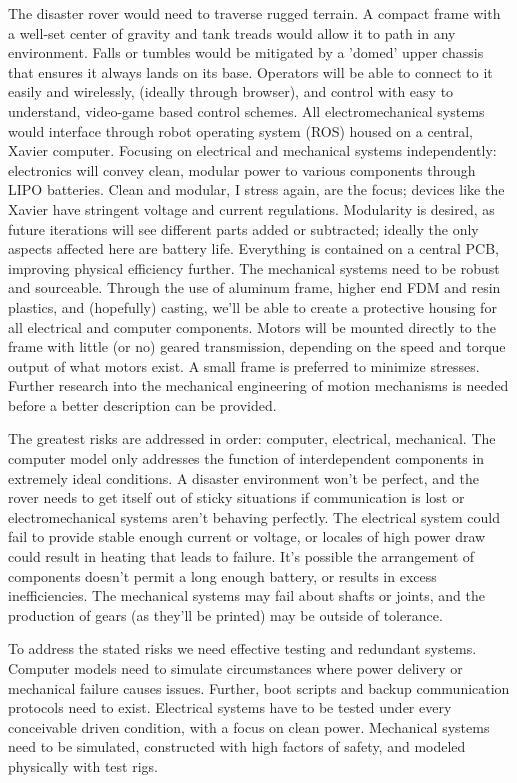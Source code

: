 \documentclass[a4paper, 10pt]{article}
\begin{document}
	The disaster rover would need to traverse rugged terrain. A compact frame with a well-set center of gravity and tank treads would allow it to path in any environment. Falls or tumbles would be mitigated by a 'domed' upper chassis that ensures it always lands on its base. Operators will be able to connect to it easily and wirelessly, (ideally through browser), and control with easy to understand, video-game based control schemes. All electromechanical systems would interface through robot operating system (ROS) housed on a central, Xavier computer. Focusing on electrical and mechanical systems independently: electronics will convey clean, modular power to various components through LIPO batteries. Clean and modular, I stress again, are the focus; devices like the Xavier have stringent voltage and current regulations. Modularity is desired, as future iterations will see different parts added or subtracted; ideally the only aspects affected here are battery life. Everything is contained on a central PCB, improving physical efficiency further. The mechanical systems need to be robust and sourceable. Through the use of aluminum frame, higher end FDM and resin plastics, and (hopefully) casting, we'll be able to create a protective housing for all electrical and computer components. Motors will be mounted directly to the frame with little (or no) geared transmission, depending on the speed and torque output of what motors exist. A small frame is preferred to minimize stresses. Further research into the mechanical engineering of motion mechanisms is needed before a better description can be provided. 
	
	The greatest risks are addressed in order: computer, electrical, mechanical. The computer model only addresses the function of interdependent components in extremely ideal conditions. A disaster environment won't be perfect, and the rover needs to get itself out of sticky situations if communication is lost or electromechanical systems aren't behaving perfectly. The electrical system could fail to provide stable enough current or voltage, or locales of high power draw could result in heating that leads to failure. It's possible the arrangement of components doesn't permit a long enough battery, or results in excess inefficiencies. The mechanical systems may fail about shafts or joints, and the production of gears (as they'll be printed) may be outside of tolerance.
	
	To address the stated risks we need effective testing and redundant systems. Computer models need to simulate circumstances where power delivery or mechanical failure causes issues. Further, boot scripts and backup communication protocols need to exist. Electrical systems have to be tested under every conceivable driven condition, with a focus on clean power. Mechanical systems need to be simulated, constructed with high factors of safety, and modeled physically with test rigs.
 	
\end{document}

